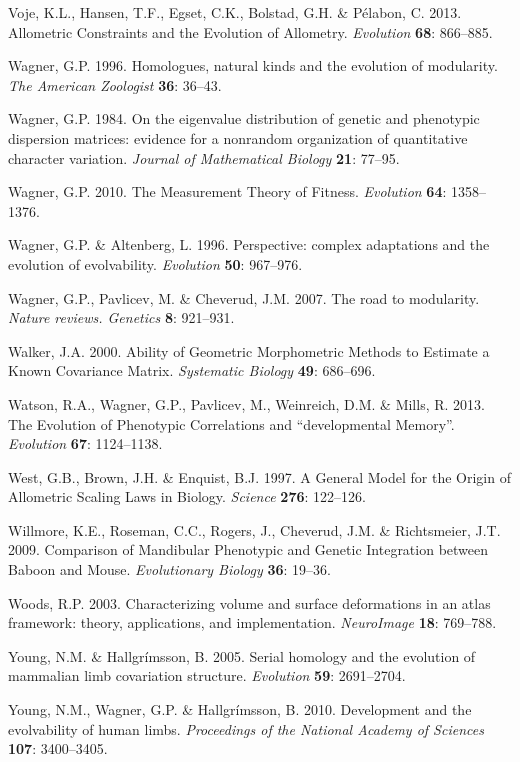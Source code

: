 \documentclass[12pt,twoside]{report}
\begin{document}
Voje, K.L., Hansen, T.F., Egset, C.K., Bolstad, G.H. \& Pélabon, C.
2013. Allometric Constraints and the Evolution of Allometry.
\emph{Evolution} \textbf{68}: 866--885.

Wagner, G.P. 1996. Homologues, natural kinds and the evolution of
modularity. \emph{The American Zoologist} \textbf{36}: 36--43.

Wagner, G.P. 1984. On the eigenvalue distribution of genetic and
phenotypic dispersion matrices: evidence for a nonrandom organization of
quantitative character variation. \emph{Journal of Mathematical Biology}
\textbf{21}: 77--95.

Wagner, G.P. 2010. The Measurement Theory of Fitness. \emph{Evolution}
\textbf{64}: 1358--1376.

Wagner, G.P. \& Altenberg, L. 1996. Perspective: complex adaptations and
the evolution of evolvability. \emph{Evolution} \textbf{50}: 967--976.

Wagner, G.P., Pavlicev, M. \& Cheverud, J.M. 2007. The road to
modularity. \emph{Nature reviews. Genetics} \textbf{8}: 921--931.

Walker, J.A. 2000. Ability of Geometric Morphometric Methods to Estimate
a Known Covariance Matrix. \emph{Systematic Biology} \textbf{49}:
686--696.

Watson, R.A., Wagner, G.P., Pavlicev, M., Weinreich, D.M. \& Mills, R.
2013. The Evolution of Phenotypic Correlations and ``developmental
Memory''. \emph{Evolution} \textbf{67}: 1124--1138.

West, G.B., Brown, J.H. \& Enquist, B.J. 1997. A General Model for the
Origin of Allometric Scaling Laws in Biology. \emph{Science}
\textbf{276}: 122--126.

Willmore, K.E., Roseman, C.C., Rogers, J., Cheverud, J.M. \&
Richtsmeier, J.T. 2009. Comparison of Mandibular Phenotypic and Genetic
Integration between Baboon and Mouse. \emph{Evolutionary Biology}
\textbf{36}: 19--36.

Woods, R.P. 2003. Characterizing volume and surface deformations in an
atlas framework: theory, applications, and implementation.
\emph{NeuroImage} \textbf{18}: 769--788.

Young, N.M. \& Hallgrímsson, B. 2005. Serial homology and the evolution
of mammalian limb covariation structure. \emph{Evolution} \textbf{59}:
2691--2704.

Young, N.M., Wagner, G.P. \& Hallgrímsson, B. 2010. Development and the
evolvability of human limbs. \emph{Proceedings of the National Academy
of Sciences} \textbf{107}: 3400--3405.
\end{document}
